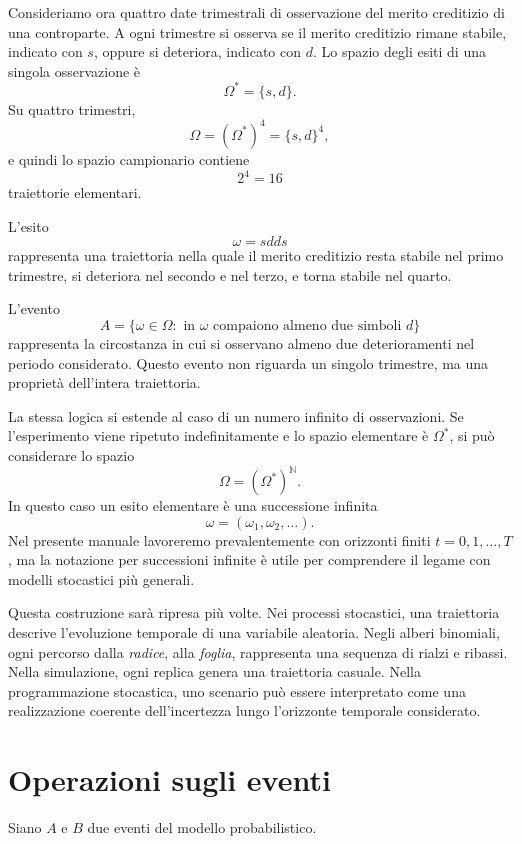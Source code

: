 \begin{example}
Consideriamo ora quattro date trimestrali di osservazione del merito
creditizio di una controparte. A ogni trimestre si osserva se il merito
creditizio rimane stabile, indicato con $s$, oppure si deteriora, indicato con
$d$. Lo spazio degli esiti di una singola osservazione \`{e}
\[
\Omega^{\ast}=\{s,d\}.
\]
Su quattro trimestri,
\[
\Omega=(\Omega^{\ast})^{4}=\{s,d\}^{4},
\]
e quindi lo spazio campionario contiene
\[
2^{4}=16
\]
traiettorie elementari.

L'esito
\[
\omega=sdds
\]
rappresenta una traiettoria nella quale il merito creditizio resta stabile nel
primo trimestre, si deteriora nel secondo e nel terzo, e torna stabile nel quarto.

L'evento
\[
A=\{\omega\in\Omega:\text{ in }\omega\text{ compaiono almeno due simboli }d\}
\]
rappresenta la circostanza in cui si osservano almeno due deterioramenti nel
periodo considerato. Questo evento non riguarda un singolo trimestre, ma una
propriet\`{a} dell'intera traiettoria.
\end{example}

La stessa logica si estende al caso di un numero infinito di osservazioni. Se
l'esperimento viene ripetuto indefinitamente e lo spazio elementare \`{e}
$\Omega^{\ast}$, si pu\`{o} considerare lo spazio
\[
\Omega=(\Omega^{\ast})^{\mathbb{N}}.
\]
In questo caso un esito elementare \`{e} una successione infinita
\[
\omega=(\omega_{1},\omega_{2},\ldots).
\]
Nel presente manuale lavoreremo prevalentemente con orizzonti finiti
$t=0,1,\ldots,T$, ma la notazione per successioni infinite \`{e} utile per
comprendere il legame con modelli stocastici pi\`{u} generali.

Questa costruzione sar\`{a} ripresa pi\`{u} volte. Nei processi stocastici,
una traiettoria descrive l'evoluzione temporale di una variabile aleatoria.
Negli alberi binomiali, ogni percorso dalla \textit{radice}, alla \textit{foglia},
rappresenta una sequenza di rialzi e ribassi. Nella simulazione, ogni replica
genera una traiettoria casuale. Nella programmazione stocastica, uno scenario
pu\`{o} essere interpretato come una realizzazione coerente dell'incertezza
lungo l'orizzonte temporale considerato.

\section{Operazioni sugli eventi}

Siano $A$ e $B$ due eventi del modello probabilistico.

